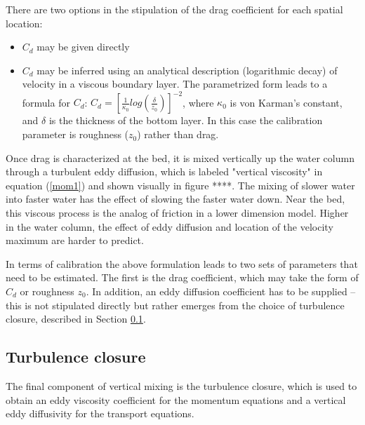 There are two options in the stipulation of the drag coefficient for each spatial location:
\begin{itemize}
	\item $C_d$ may be given directly
	\item $C_d$ may be inferred using an analytical description (logarithmic decay) of velocity in a viscous boundary layer. The parametrized form leads to a formula for $C_d$: 
	$C_d=[\frac{1}{\kappa_0}log(\frac{\delta}{z_0})]^{-2}$, where $\kappa_0$ is von Karman's constant, and $\delta$ is the thickness
of the bottom layer. In this case the calibration parameter is roughness ($z_0$) rather than drag.
\end{itemize}

Once drag is characterized at the bed, it is mixed vertically up the water column through a turbulent eddy diffusion, which is
labeled "vertical viscosity" in equation (\ref{mom1}) and shown visually in figure ****. The mixing of slower water into 
faster water has the effect of slowing the faster water down. Near the bed, this viscous process is the analog of
friction in a lower dimension model. Higher in the water column, the effect of eddy diffusion and location of the velocity
maximum are harder to predict.

In terms of calibration the above formulation leads to two sets of parameters that need to be estimated. The first is the
drag coefficient, which may take the form of $C_d$ or roughness $z_0$. In addition, an eddy diffusion coefficient 
has to be supplied -- this is not stipulated directly but rather emerges from the choice of turbulence closure, described in Section \ref{sec-tur}.

\subsection{Turbulence closure}\label{sec-tur}
The final component of vertical mixing is the turbulence closure, which is used to obtain an eddy viscosity coefficient
for the momentum equations and a vertical eddy diffusivity for the transport equations. 


